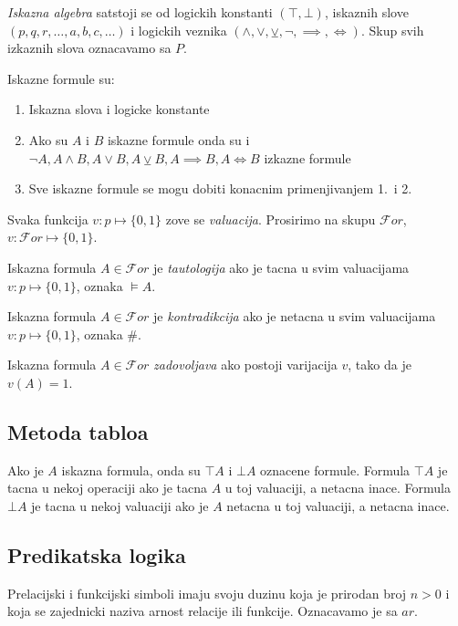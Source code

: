 \documentclass[12p,14paper]{article}
\begin{document}
\begin{multicols}{2}
    \textit{Iskazna algebra} satstoji se od logickih konstanti $(\top, \bot)$,
    iskaznih slove $(p, q, r, \ldots, a, b, c, \ldots)$ i logickih veznika
    $(\land, \lor, \veebar, \neg, \implies, \iff)$. Skup svih izkaznih slova
    oznacavamo sa $P$.

    Iskazne formule su:
    \begin{enumerate}
        \itemsep0em
        \item Iskazna slova i logicke konstante
        \item Ako su $A$ i $B$ iskazne formule onda su i 
              $\neg A, A \land B, A \lor B, A \veebar B, A \implies B, 
              A \iff B$ izkazne formule
        \item Sve iskazne formule se mogu dobiti konacnim 
              primenjivanjem 1.\ i 2.
    \end{enumerate}

    Svaka funkcija $v : p \mapsto \{0, 1\}$ zove se \textit{valuacija}. 
    Prosirimo na skupu $\mathcal{F}or$, $v : \mathcal{F}or \mapsto \{0, 1\}$.

    Iskazna formula $A \in \mathcal{F}or$ je \textit{tautologija} ako je 
    tacna u svim valuacijama $v : p \mapsto \{0, 1\}$, oznaka $\models A$.

    Iskazna formula $A \in \mathcal{F}or$ je \textit{kontradikcija} ako je 
    netacna u svim valuacijama $v : p \mapsto \{0, 1\}$, oznaka \#.

    Iskazna formula $A \in \mathcal{F}or$ \textit{zadovoljava} ako postoji
    varijacija $v$, tako da je $v (A) = 1$.
    

\subsection{Metoda tabloa}

    Ako je $A$ iskazna formula, onda su $\top A$ i $\bot A$ oznacene formule. 
    Formula $\top A$ je tacna u nekoj operaciji ako je tacna $A$ u toj 
    valuaciji, a netacna inace. Formula $\bot A$ je tacna u nekoj valuaciji 
    ako je $A$ netacna u toj valuaciji, a netacna inace.

\subsection{Predikatska logika}

    Prelacijski i funkcijski simboli imaju svoju duzinu koja je prirodan broj 
    $n > 0$ i koja se zajednicki naziva arnost relacije ili funkcije. 
    Oznacavamo je sa $ar$.


\end{multicols}
\end{document}
